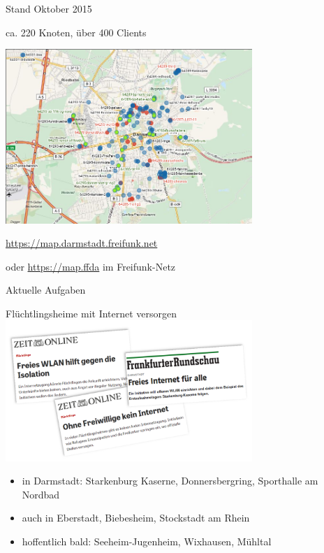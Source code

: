 \documentclass[10pt]{beamer}
\begin{document}
\begin{frame}{Stand Oktober 2015}
	\begin{center}
		\vfill
		ca. 220 Knoten, über 400 Clients
		\begin{center}
			\includegraphics[width=0.7\textwidth]{images/2015-10-03_darmstadt-map}
		\end{center}

		\vfill
		\url{https://map.darmstadt.freifunk.net}
		
		\tiny oder \url{https://map.ffda} im Freifunk-Netz
	\end{center}	
\end{frame}

\begin{frame}{Aktuelle Aufgaben}
	\begin{center}
		\large Flüchtlingsheime mit Internet versorgen \\
		\includegraphics[width=0.7\textwidth]{images/2015-10_presse-fluechtlinge}
	\end{center}
	\begin{itemize}[<+->]
		\item in Darmstadt: Starkenburg Kaserne, Donnersbergring, Sporthalle am Nordbad
		\item auch in Eberstadt, Biebesheim, Stockstadt am Rhein
		\item hoffentlich bald: Seeheim-Jugenheim, Wixhausen, Mühltal
	\end{itemize}	
\end{frame}	
\end{document}
